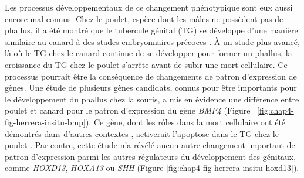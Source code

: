 Les processus développementaux de ce changement phénotypique sont eux aussi encore mal connus. Chez le poulet, espèce dont les mâles ne possèdent pas de phallus, il a été montré que le tubercule génital (\acrshort{TG}) se développe d’une manière similaire au canard à des stades embryonnaires précoces \citep{herrera_developmental_2013}. \`A un stade plus avancé, là où le \acrshort{TG} chez le canard continue de se développer pour former un phallus, la croissance du \acrshort{TG} chez le poulet s’arrête avant de subir une mort cellulaire. Ce processus pourrait être la conséquence de changements de patron d’expression de gènes. Une étude de plusieurs gènes candidats, connus pour être importants pour le développement du phallus chez la souris, a mis en évidence une différence entre poulet et canard pour le patron d'expression du gène \textit{BMP4} (Figure~ \ref{fig:chap4-fig-herrera-insitu-bmp}). Ce gène, dont les rôles dans la mort cellulaire ont été démontrés dans d'autres contextes \citep{marazzi_msx2_1997,trousse_bmp4_2001,de_paepe_bmp4_2019}, activerait l’apoptose dans le \acrshort{TG} chez le poulet \citep{herrera_developmental_2013}. Par contre, cette étude n'a révélé aucun autre changement important de patron d'expression parmi les autres régulateurs du développement des génitaux, comme \textit{HOXD13}, \textit{HOXA13} ou \textit{SHH} (Figure \ref{fig:chap4-fig-herrera-insitu-hoxd13}). \\

